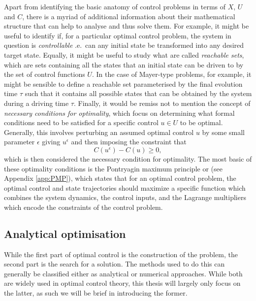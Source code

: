 Apart from identifying the basic anatomy of control problems in terms of $X$, $U$ and $C$, there is a myriad of additional information about their mathematical structure that can help to analyse and thus solve them. For example, it might be useful to identify if, for a particular optimal control problem, the system in question is \emph{controllable}\cite{dirr_lie_2008, fleming_optimal_1975} \@i.e.~can any initial state be transformed into any desired target state. Equally, it might be useful to study what are called \emph{reachable sets}\cite{vom_ende_reachability_2020, fleming_optimal_1975}, which are sets containing all the states that an initial state can be driven to by the set of control functions $U$. In the case of Mayer-type problems, for example, it might be sensible to define a reachable set parameterised by the final evolution time $\tau$ such that it contains all possible states that can be obtained by the system during a driving time $\tau$. Finally, it would be remiss not to mention the concept of \emph{necessary conditions for optimality}\cite{mangasarian_sufficient_1966}, which focus on determining what formal conditions need to be satisfied for a specific control $u \in U$ to be optimal. Generally, this involves perturbing an assumed optimal control $u$ by some small parameter $\epsilon$ giving $u^{\epsilon}$ and then imposing the constraint that
\begin{equation}\label{eq:optimality_condition}
    C(u^{\epsilon}) - C(u) \geq 0,
\end{equation}
which is then considered the necessary condition for optimality. The most basic of these optimality conditions is the Pontryagin maximum principle or  \cite{boltyanski_nonclassical_1999} (see Appendix \ref{app:PMP}), which states that for an optimal control problem, the optimal control and state trajectories should maximize a specific function which combines the system dynamics, the control inputs, and the Lagrange multipliers which encode the constraints of the control problem.

\subsection{Analytical optimisation}\label{sec:3.1.2_analytic_optimisation}

While the first part of optimal control is the construction of the problem, the second part is the search for a solution. The methods used to do this can generally be classified either as analytical or numerical approaches. While both are widely used in optimal control theory, this thesis will largely only focus on the latter, as such we will be brief in introducing the former. 


